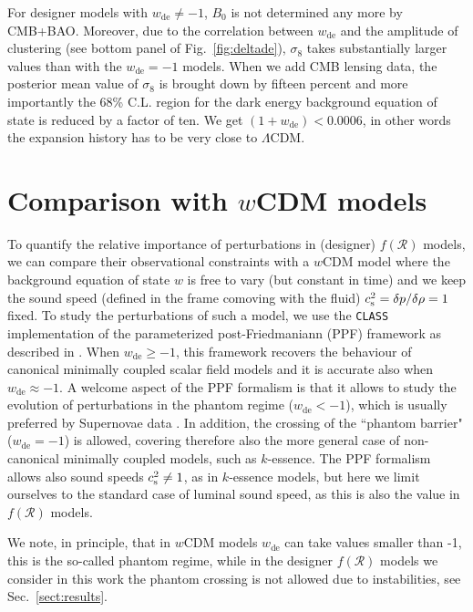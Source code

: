 \documentclass[nofootinbib,a4paper,aps,prd,10pt,superscriptaddress,reprint,showkeys,showpacs]{revtex4-1}
\newcommand{\qsubrm}[2]{{#1}_{\scriptscriptstyle{\textrm{#2}}}}
\begin{document}
For designer models with $\qsubrm{w}{de}\neq-1$, $\qsubrm{B}{0}$ is not determined any more by CMB+BAO. Moreover, due 
to the correlation between $\qsubrm{w}{de}$ and the amplitude of clustering (see bottom panel of 
Fig.~\ref{fig:deltade}), $\qsubrm{\sigma}{8}$ takes substantially larger values than with the $\qsubrm{w}{de}=-1$ 
models. 
When we add CMB lensing data, the posterior mean value of $\qsubrm{\sigma}{8}$ is brought down by fifteen percent and 
more importantly the 68\% C.L. region for the dark energy background equation of state is reduced by a factor of ten. 
We get $(1+\qsubrm{w}{de})<0.0006$, in other words the expansion history has to be very close to $\Lambda$CDM.

\section{Comparison with \texorpdfstring{$w$CDM}{wCDM} models}\label{sect:wCDM}
To quantify the relative importance of perturbations in (designer) $f(\mathcal{R})$ models, we can compare their 
observational constraints with a $w$CDM model where the background equation of state $w$ is free to vary (but 
constant in time) and we keep the sound speed (defined in the frame comoving with the fluid) 
$c_{\rm s}^2 = \delta p/\delta\rho = 1$ fixed. To study the perturbations of such a model, we use the \verb|CLASS| 
implementation of the parameterized post-Friedmaniann (PPF) framework as described in \cite{Fang2008}. When 
$\qsubrm{w}{de}\geq -1$, this framework recovers the behaviour of canonical minimally coupled scalar field models and 
it is accurate also when $\qsubrm{w}{de}\approx -1$. A welcome aspect of the PPF formalism is that it allows to study 
the evolution of perturbations in the phantom regime ($\qsubrm{w}{de}<-1$), which is usually preferred by Supernovae 
data \citep{Tonry2003,Riess2004}. In addition, the crossing of the ``phantom barrier" ($\qsubrm{w}{de}=-1$) is allowed, 
covering therefore also the more general case of non-canonical minimally coupled models, such as $k$-essence. The PPF 
formalism allows also sound speeds $c_{\rm s}^2\neq 1$, as in $k$-essence models, but here we limit ourselves to the 
standard case of luminal sound speed, as this is also the value in $f(\mathcal{R})$ models.

We note, in principle, that in $w$CDM models $\qsubrm{w}{de}$ can take values smaller than -1, this is the so-called 
phantom regime, while in the designer $f(\mathcal{R})$ models we consider in this work the phantom crossing is not 
allowed due to instabilities, see Sec.~\ref{sect:results}.
\end{document}
